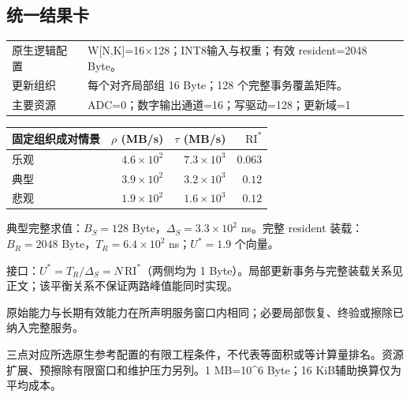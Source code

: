 \subsection*{统一结果卡}
\begingroup\small
\noindent\begin{tabularx}{\textwidth}{@{}p{24mm}X@{}}\toprule
原生逻辑配置 & W[N,K]=16×128；INT8输入与权重；有效 resident=2048 Byte。\\
更新组织 & 每个对齐局部组 16 Byte；128 个完整事务覆盖矩阵。\\
主要资源 & ADC=0；数字输出通道=16；写驱动=128；更新域=1\\
\bottomrule\end{tabularx}
\vspace{3mm}
\begin{center}\begin{tabular}{@{}lrrr@{}}\toprule
固定组织成对情景 & $\rho$ (MB/s) & $\tau$ (MB/s) & $\mathrm{RI}^{*}$\\\midrule
乐观 & $4.6\times10^{2}$ & $7.3\times10^{3}$ & $0.063$\\
典型 & $3.9\times10^{2}$ & $3.2\times10^{3}$ & $0.12$\\
悲观 & $1.9\times10^{2}$ & $1.6\times10^{3}$ & $0.12$\\
\bottomrule\end{tabular}\end{center}
\noindent 典型完整求值：$B_S=128$ Byte，$\Delta_S=3.3\times10^{2}$ ns。完整 resident 装载：$B_R=2048$ Byte，$T_R=6.4\times10^{2}$ ns；$U^*=1.9$ 个向量。
\par\smallskip\noindent 接口：$U^*=T_R/\Delta_S=N\,\mathrm{RI}^*$（两侧均为 1 Byte）。局部更新事务与完整装载关系见正文；该平衡关系不保证两路峰值能同时实现。
\par\smallskip\noindent 原始能力与长期有效能力在所声明服务窗口内相同；必要局部恢复、终验或擦除已纳入完整服务。
\par\smallskip\noindent 三点对应所选原生参考配置的有限工程条件，不代表等面积或等计算量排名。资源扩展、预擦除有限窗口和维护压力另列。1 MB=10\textasciicircum{}6 Byte；16 KiB辅助换算仅为平均成本。
\endgroup
\clearpage

